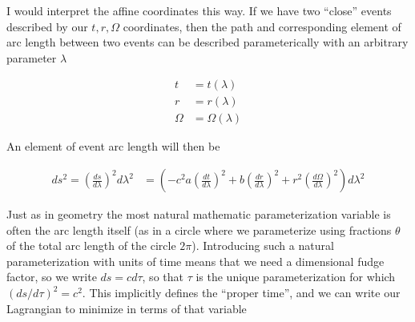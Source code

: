 \documentclass{article}      %
\newcommand{\PD}[2]{\frac{\partial {#2}}{\partial {#1}}}
\newcommand{\CC}[0]{c^2}
\newcommand{\adot}[0]{\dot{a}}
\newcommand{\rdot}[0]{\dot{r}}
\begin{document}

%




I would interpret the affine coordinates this way.  If we have two ``close'' events described by our $t,r,\Omega$ coordinates, then the path and corresponding
element of arc length between two events can be described parameterically
with an arbitrary parameter $\lambda$

\begin{align*}
t &= t(\lambda) \\
r &= r(\lambda) \\
\Omega &= \Omega(\lambda)
\end{align*}

An element of event arc length will then be

\begin{align*}
ds^2 = \left(\frac{ds}{d\lambda}\right)^2 {d\lambda}^2
&=
\left( -\CC a \left(\frac{dt}{d\lambda}\right)^2 + {b} \left(\frac{dr}{d\lambda}\right)^2 + r^2\left(\frac{d\Omega}{d\lambda}\right)^2 \right) {d\lambda}^2
\end{align*}

Just as in geometry the most natural mathematic parameterization variable is often the arc length itself (as in a circle where we parameterize using fractions $\theta$ of the total arc length of the circle $2\pi$).
Introducing such a natural parameterization with units of time means that we need a dimensional fudge factor, so we write $ds = c d\tau$, so that $\tau$ is the unique parameterization for which $(ds/d\tau)^2 = c^2$.
This implicitly defines the ``proper time'', and we can write our Lagrangian to minimize in terms of that variable
\end{document}
